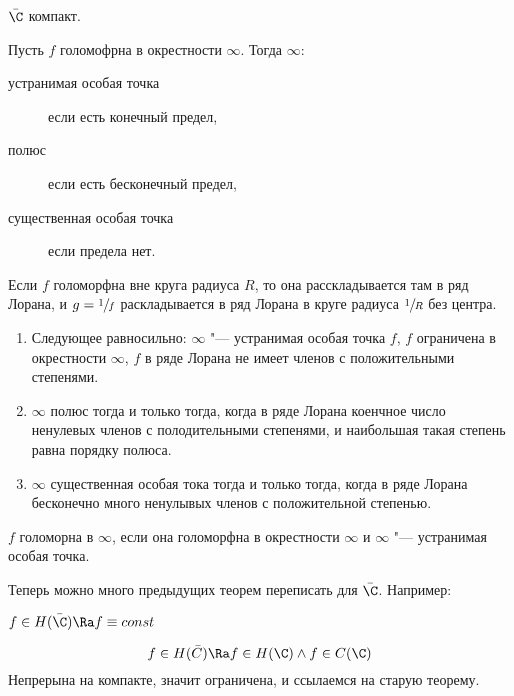 \begin{conseq}
	$\bar \C$ компакт.
\end{conseq}

\begin{Def}
	Пусть $f$ голомофрна в окрестности $\infty$.
	Тогда $\infty$:
	\begin{description}
		\item[устранимая особая точка] если есть конечный предел,
		\item[полюс] если есть бесконечный предел,
		\item[существенная особая точка] если предела нет.
	\end{description}
\end{Def}

\begin{Rem}
	Если $f$ голоморфна вне круга радиуса $R$, то она расскладывается там в ряд Лорана,
	и $g = \sfrac1f$ раскладывается в ряд Лорана в круге радиуса $\sfrac1R$ без центра.
\end{Rem}

\begin{theorem}\begin{enumerate}
\item
	Следующее равносильно:
	$\infty$ "--- устранимая особая точка $f$,
	$f$ ограничена в окрестности $\infty$,
	$f$ в ряде Лорана не имеет членов с положительными степенями.

\item
	$\infty$ полюс тогда и только тогда, когда в ряде Лорана коенчное число ненулевых членов с полодительными степенями,
	и наибольшая такая степень равна порядку полюса.

\item
	$\infty$ существенная особая тока тогда и только тогда, когда в ряде Лорана бесконечно много ненулывых членов с положительной степенью.
\end{enumerate}\end{theorem}

\begin{Def}
	$f$ голоморна в $\infty$, если она голоморфна в окрестности $\infty$ и $\infty$ "--- устранимая особая точка.
\end{Def}

Теперь можно много предыдущих теорем переписать для $\bar \C$.
Например:

\begin{theorem}[Лиувилля]
	$f \in H(\bar \C) \Ra f \equiv const$
\end{theorem}
\begin{Def}
	\[ f \in H(\bar C) \Ra f \in H(\C) \land f \in C(\C) \]
	Непрерына на компакте, значит ограничена, и ссылаемся на старую теорему.
\end{Def}

